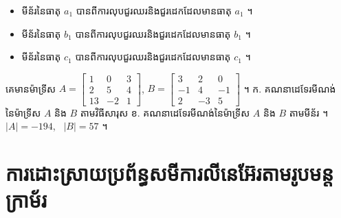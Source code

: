 \begin{itemize}
  \item មីន័រនៃធាតុ $a_1$ បានពីការលុបជួរឈរនិងជួរដេកដែលមានធាតុ $a_1$ ។
  \item មីន័រនៃធាតុ $b_1$ បានពីការលុបជួរឈរនិងជួរដេកដែលមានធាតុ $b_1$ ។
  \item មីន័រនៃធាតុ $c_1$ បានពីការលុបជួរឈរនិងជួរដេកដែលមានធាតុ $c_1$ ។
\end{itemize}

\begin{pro}
គេមានម៉ាទ្រីស $A = \begin{bmatrix} 1 & 0 & 3\\ 2 & 5 & 4\\ 13 & -2 & 1 \end{bmatrix}$, $B = \begin{bmatrix} 3 & 2 & 0\\ -1 & 4 & -1\\ 2 & -3 & 5 \end{bmatrix}$ ។ \quad ក. គណនាដេទែរមីណង់នៃម៉ាទ្រីស $A$ និង $B$ តាមវិធីសារុស \quad ខ. គណនាដេទែរមីណង់នៃម៉ាទ្រីស $A$ និង $B$ តាមមីន័រ ។
\ans
$|A| = -194$, \ $|B| = 57$ ។
\end{pro}

\section{ការដោះស្រាយប្រព័ន្ធសមីការលីនេអ៊ែរតាមរូបមន្តក្រាម័រ}

